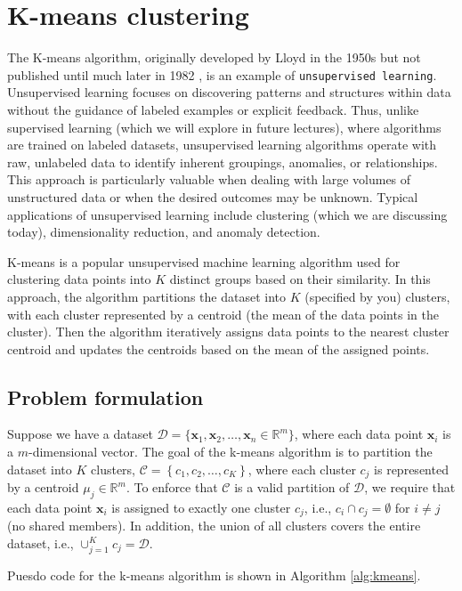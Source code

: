 \documentclass{article}[11pt]
\begin{document}
\section{K-means clustering}
The K-means algorithm, originally developed by Lloyd in the 1950s but not published until much later in 1982 \citep{Lloyd-1982}, is an example of \texttt{unsupervised learning}. 
Unsupervised learning focuses on discovering patterns and structures within data without the guidance of labeled examples or explicit feedback. 
Thus, unlike supervised learning (which we will explore in future lectures), where algorithms are trained on labeled datasets, unsupervised learning algorithms operate with 
raw, unlabeled data to identify inherent groupings, anomalies, or relationships. This approach is particularly valuable when dealing with large volumes of unstructured data or when the desired outcomes may be unknown. 
Typical applications of unsupervised learning include clustering (which we are discussing today), dimensionality reduction, and anomaly detection. 

K-means is a popular unsupervised machine learning algorithm used for clustering data points into $K$ distinct groups based on their similarity.
In this approach, the algorithm partitions the dataset into $K$ (specified by you) clusters, 
with each cluster represented by a centroid (the mean of the data points in the cluster). 
Then the algorithm iteratively assigns data points to the nearest cluster centroid and updates the centroids 
based on the mean of the assigned points.

\subsection{Problem formulation}
Suppose we have a dataset $\mathcal{D} = \{\mathbf{x}_1, \mathbf{x}_2, \ldots, \mathbf{x}_n\in\mathbb{R}^{m}\}$, where each data point $\mathbf{x}_i$ is a $m$-dimensional vector.
The goal of the k-means algorithm is to partition the dataset into $K$ clusters, $\mathcal{C} = \left\{c_{1},c_{2},\dots, c_{K}\right\}$, 
where each cluster $c_{j}$ is represented by a centroid $\mu_j\in\mathbb{R}^{m}$. To enforce that $\mathcal{C}$ is a valid partition of $\mathcal{D}$, we require that each data point $\mathbf{x}_i$ is assigned to exactly one cluster $c_{j}$, i.e., $c_{i}\cap c_{j} = \emptyset$ for $i\neq j$ (no shared members).
In addition, the union of all clusters covers the entire dataset, i.e., $\cup_{j=1}^{K}c_{j} = \mathcal{D}$.


Puesdo code for the k-means algorithm is shown in Algorithm \ref{alg:kmeans}.
\end{document}
